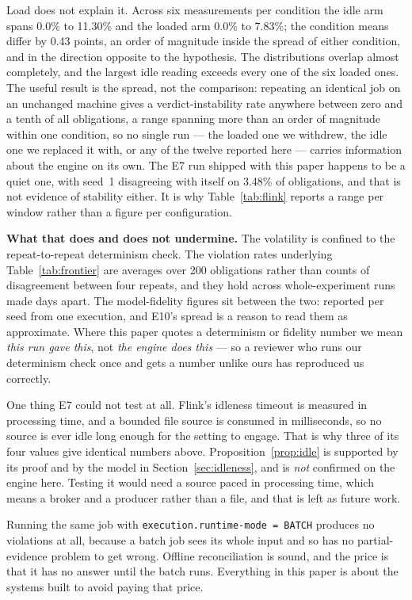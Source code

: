 \documentclass[10pt,conference]{IEEEtran}
\begin{document}
Load does not explain it. Across six measurements per condition the idle arm
spans 0.0\% to 11.30\% and the loaded arm 0.0\% to 7.83\%; the condition means
differ by 0.43 points, an order of magnitude inside the spread of either
condition, and in the direction opposite to the hypothesis. The distributions
overlap almost completely, and the largest idle reading exceeds every one of
the six loaded ones. The useful result is the spread, not the comparison:
repeating an identical job on an unchanged machine gives a verdict-instability
rate anywhere between zero and a tenth of all obligations, a range spanning
more than an order of magnitude within one condition, so no single run --- the
loaded one we withdrew, the idle one we replaced it with, or any of the twelve
reported here --- carries information about the engine on its own. The E7 run
shipped with this paper happens to be a quiet one, with seed~1 disagreeing with
itself on 3.48\% of obligations, and that is not evidence of stability either.
It is why Table~\ref{tab:flink} reports a range per window rather than a figure
per configuration.

\textbf{What that does and does not undermine.} The volatility is confined to
the repeat-to-repeat determinism check. The violation rates underlying
Table~\ref{tab:frontier} are averages over 200 obligations rather than counts of
disagreement between four repeats, and they hold across whole-experiment runs
made days apart. The model-fidelity figures sit between the two: reported per
seed from one execution, and E10's spread is a reason to read them as
approximate. Where this paper quotes a determinism or fidelity number we mean
\emph{this run gave this}, not \emph{the engine does this} --- so a reviewer who
runs our determinism check once and gets a number unlike ours has reproduced us
correctly.

One thing E7 could not test at all. Flink's idleness timeout is measured in
processing time, and a bounded file source is consumed in milliseconds, so no source is ever idle long enough for the setting to engage. That is why
three of its four values give identical numbers above. Proposition~\ref{prop:idle} is
supported by its proof and by the model in Section~\ref{sec:idleness}, and is
\emph{not} confirmed on the engine here. Testing it would need a source paced in
processing time, which means a broker and a producer rather than a file, and
that is left as future work.

Running the same job with \texttt{execution.runtime-mode = BATCH} produces no
violations at all, because a batch job sees its whole input and so has no
partial-evidence problem to get wrong. Offline reconciliation is sound, and the
price is that it has no answer until the batch runs. Everything in this paper is
about the systems built to avoid paying that price.
\end{document}
